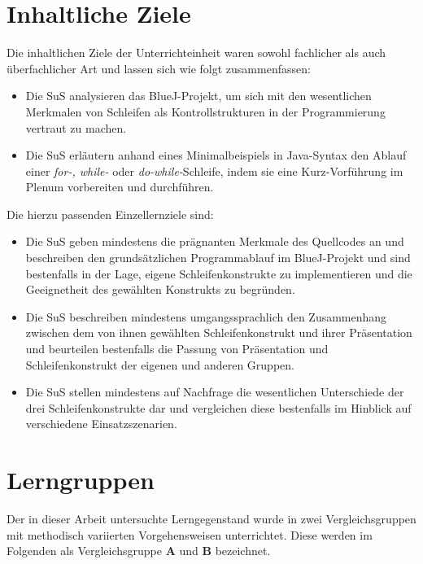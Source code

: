 \documentclass[paper=a4, DIV=13, BCOR=12mm, twoside=on, onecolumn=on, open = any, titlepage =on, parskip =half-, headsepline = on, footsepline = on, chapterprefix = on, sectionprefix = on, appendixprefix = off, fontsize = 11pt, numbers = noenddot, abstract = off]{scrreprt}
\begin{document}
 \section{Inhaltliche Ziele}
\onehalfspacing
Die inhaltlichen Ziele der Unterrichteinheit waren sowohl fachlicher als auch überfachlicher Art und lassen sich wie folgt zusammenfassen:
\begin{itemize}
\item Die SuS analysieren das BlueJ-Projekt, um sich mit den wesentlichen Merkmalen von Schleifen als Kontrollstrukturen in der Programmierung vertraut zu machen.
\item Die SuS erläutern anhand eines Minimalbeispiels in Java-Syntax den Ablauf einer \emph{for-, while-} oder \emph{do-while-}Schleife, indem sie eine Kurz-Vorführung im Plenum vorbereiten und durchführen.
\end{itemize}
Die hierzu passenden Einzellernziele sind:
\begin{itemize}
\item Die SuS geben mindestens die prägnanten Merkmale des Quellcodes an und beschreiben den grundsätzlichen Programmablauf im BlueJ-Projekt und sind bestenfalls in der Lage, eigene Schleifenkonstrukte zu implementieren und die Geeignetheit des gewählten Konstrukts zu begründen.
\item Die SuS beschreiben mindestens umgangssprachlich den Zusammenhang zwischen dem von ihnen gewählten Schleifenkonstrukt und ihrer Präsentation und beurteilen bestenfalls die Passung von Präsentation und Schleifenkonstrukt der eigenen und anderen Gruppen.
\item Die SuS stellen mindestens auf Nachfrage die wesentlichen Unterschiede der drei Schleifenkonstrukte dar und vergleichen diese bestenfalls im Hinblick auf verschiedene Einsatzszenarien.
\end{itemize}


\par \singlespacing
 \section{Lerngruppen}
\onehalfspacing
Der in dieser Arbeit untersuchte Lerngegenstand wurde in zwei Vergleichsgruppen mit methodisch variierten Vorgehensweisen unterrichtet. Diese werden im Folgenden als Vergleichsgruppe \textsc{\textbf{A}} und \textsc{\textbf{B}} bezeichnet.
\end{document}
